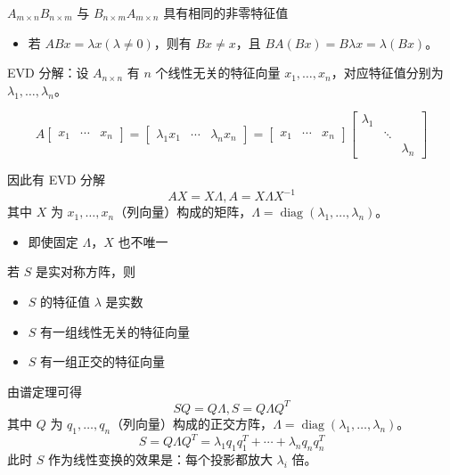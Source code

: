 \begin{remark}
    $A_{m\times n}B_{n\times m}$ 与 $B_{n\times m}A_{m\times n}$ 具有相同的非零特征值
    \begin{itemize}
        \item 若 $ABx = \lambda x(\lambda \neq 0)$，则有 $Bx \neq x$，且 $BA(Bx) = B\lambda x = \lambda (Bx)$。
    \end{itemize}
\end{remark}

\begin{remark}
    EVD 分解：设 $A_{n\times n}$ 有 $n$ 个线性无关的特征向量 $x_1, \dots, x_n$，对应特征值分别为 $\lambda_1, \dots, \lambda_n$。
    
    \[A\begin{bmatrix}
        x_1 & \cdots & x_n 
    \end{bmatrix} = \begin{bmatrix}
        \lambda_1 x_1 & \cdots & \lambda_n x_n 
    \end{bmatrix} = \begin{bmatrix}
        x_1 & \cdots & x_n 
    \end{bmatrix} \begin{bmatrix}
        \lambda_1 & & \\
        & \ddots & \\
        & & \lambda_n
    \end{bmatrix}\]
    
    因此有 EVD 分解 \[AX = X\Lambda, A = X\Lambda X^{-1}\]
    其中 $X$ 为 $x_1, \dots, x_n$（列向量）构成的矩阵，$\Lambda = \operatorname{diag}(\lambda_1, \dots, \lambda_n)$。
    \begin{itemize}
        \item 即使固定 $\Lambda$，$X$ 也不唯一
    \end{itemize} 
\end{remark}

\begin{remark}
    若 $S$ 是实对称方阵，则 
    \begin{itemize}
        \item $S$ 的特征值 $\lambda$ 是实数
        \item $S$ 有一组线性无关的特征向量
        \item $S$ 有一组正交的特征向量
    \end{itemize}

    由谱定理可得 \[SQ = Q\Lambda, S = Q\Lambda Q^T\]
    其中 $Q$ 为 $q_1, \dots, q_n$（列向量）构成的正交方阵，$\Lambda = \operatorname{diag}(\lambda_1, \dots, \lambda_n)$。
    \[S = Q\Lambda Q^T = \lambda_1q_1q_1^T + \cdots + \lambda_nq_nq_n^T\]
    此时 $S$ 作为线性变换的效果是：每个投影都放大 $\lambda_i$ 倍。
\end{remark}

